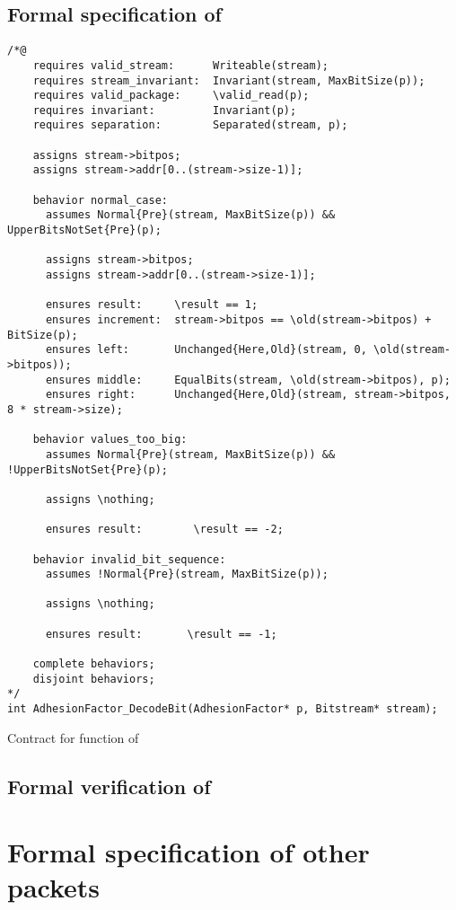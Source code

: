 \FloatBarrier

\subsection{Formal specification of }
\label{sec:adhesionfactor-encodebit}

\begin{listing}[hbt]
\begin{minipage}{0.99\textwidth}
\begin{lstlisting}[style=acsl-block]
/*@
    requires valid_stream:      Writeable(stream);
    requires stream_invariant:  Invariant(stream, MaxBitSize(p));
    requires valid_package:     \valid_read(p);
    requires invariant:         Invariant(p);
    requires separation:        Separated(stream, p);

    assigns stream->bitpos;
    assigns stream->addr[0..(stream->size-1)];

    behavior normal_case:
      assumes Normal{Pre}(stream, MaxBitSize(p)) && UpperBitsNotSet{Pre}(p);

      assigns stream->bitpos;
      assigns stream->addr[0..(stream->size-1)];

      ensures result:     \result == 1;
      ensures increment:  stream->bitpos == \old(stream->bitpos) + BitSize(p);
      ensures left:       Unchanged{Here,Old}(stream, 0, \old(stream->bitpos));
      ensures middle:     EqualBits(stream, \old(stream->bitpos), p);
      ensures right:      Unchanged{Here,Old}(stream, stream->bitpos, 8 * stream->size);

    behavior values_too_big:
      assumes Normal{Pre}(stream, MaxBitSize(p)) && !UpperBitsNotSet{Pre}(p);

      assigns \nothing;

      ensures result:        \result == -2;

    behavior invalid_bit_sequence:
      assumes !Normal{Pre}(stream, MaxBitSize(p));

      assigns \nothing;

      ensures result:       \result == -1;

    complete behaviors;
    disjoint behaviors;
*/
int AdhesionFactor_DecodeBit(AdhesionFactor* p, Bitstream* stream);
\end{lstlisting}
\end{minipage}
\caption{\label{lst:adhesionfactor-encodebit}Contract for  function of }
\end{listing}

\FloatBarrier

\subsection{Formal verification of }

\section{Formal specification of other packets}


